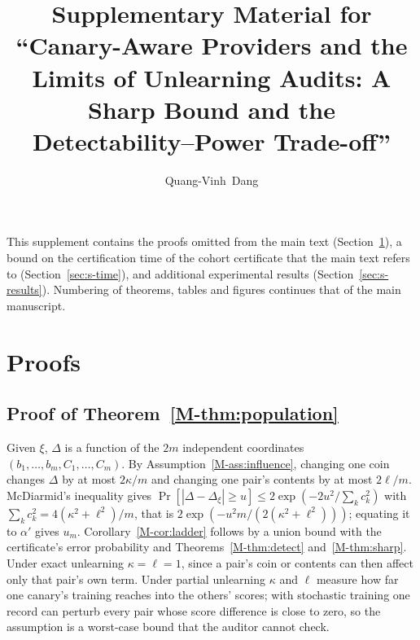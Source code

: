 \documentclass[journal]{IEEEtran}
\theoremstyle{definition}
\theoremstyle{remark}
\begin{document}
\title{Supplementary Material for\\ ``Canary-Aware Providers and the Limits of Unlearning
Audits: A Sharp Bound and the Detectability--Power Trade-off''}
\author{Quang-Vinh~Dang}
\maketitle

\setcounter{table}{6}
\setcounter{figure}{0}
\setcounter{theorem}{7}
\renewcommand{\thesection}{S-\Roman{section}}
\renewcommand{\theequation}{S\arabic{equation}}

This supplement contains the proofs omitted from the main text
(Section~\ref{sec:s-proofs}), a bound on the certification time of the cohort certificate
that the main text refers to (Section~\ref{sec:s-time}), and additional experimental results
(Section~\ref{sec:s-results}). Numbering of theorems, tables and figures continues that of the
main manuscript.

\section{Proofs}\label{sec:s-proofs}

\subsection{Proof of Theorem~\ref{M-thm:population}}

Given $\xi$, $\Delta$ is a function of the $2m$ independent coordinates
$(b_1,\dots,b_m,C_1,\dots,C_m)$. By Assumption~\ref{M-ass:influence}, changing one coin changes
$\Delta$ by at most $2\kappa/m$ and changing one pair's contents by at most $2\ell/m$.
McDiarmid's inequality \citep{mcdiarmid1989bounded} gives
$\Pr[|\Delta-\Delta_\xi|\ge u]\le2\exp(-2u^2/\sum_kc_k^2)$ with
$\sum_kc_k^2=4(\kappa^2+\ell^2)/m$, that is $2\exp(-u^2m/(2(\kappa^2+\ell^2)))$; equating it to
$\alpha'$ gives $u_m$. Corollary~\ref{M-cor:ladder} follows by a union bound with the
certificate's error probability and Theorems~\ref{M-thm:detect} and~\ref{M-thm:sharp}. Under exact
unlearning $\kappa=\ell=1$, since a pair's coin or contents can then affect only that pair's
own term. Under partial unlearning $\kappa$ and $\ell$ measure how far one canary's training
reaches into the others' scores; with stochastic training one record can perturb every pair
whose score difference is close to zero, so the assumption is a worst-case bound that the
auditor cannot check.
\end{document}
